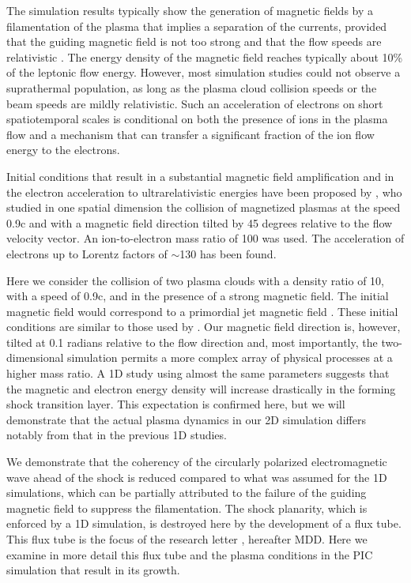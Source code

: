\documentclass[structabstract]{aa}
\begin{document}
The simulation results typically show the generation of magnetic fields by a 
filamentation of the plasma that implies a separation of the currents, provided 
that the guiding magnetic field is not too strong and that the flow speeds are 
relativistic \citep{Cary:1981sf}. The energy density of the magnetic field reaches 
typically about 10\% of the leptonic flow energy. However, most simulation studies 
could not observe a suprathermal population, as long as the plasma cloud collision 
speeds or the beam speeds are mildly relativistic. Such an acceleration of electrons 
on short spatiotemporal scales is conditional on both the presence of ions in the 
plasma flow and a mechanism that can transfer a significant fraction of the ion flow 
energy to the electrons. 

Initial conditions that result in a substantial magnetic field amplification 
and in the electron acceleration to ultrarelativistic energies have been 
proposed by \citet{Bessho:1999sf}, who studied in one spatial dimension the 
collision of magnetized plasmas at the speed 0.9c and with a magnetic field 
direction tilted by 45 degrees relative to the flow velocity vector. An
ion-to-electron mass ratio of 100 was used. The acceleration of electrons up 
to Lorentz factors of $\sim$130 has been found. 

Here we consider the collision of two plasma clouds with a density ratio of 10,
with a speed of 0.9c, and in the presence of a strong magnetic field. The
initial magnetic field would correspond to a primordial jet magnetic field
\citep{Lyutikov:2003vy,Granot:2003mw}. These initial conditions are similar 
to those used by \citet{Bessho:1999sf}. Our magnetic field direction is, 
however, tilted at 0.1 radians relative to the flow direction and, most 
importantly, the two-dimensional simulation permits a more complex array of 
physical processes at a higher mass ratio. A 1D study using almost the same 
parameters \citep{Dieckmann:2008dp} suggests that the magnetic and electron 
energy density will increase drastically in the forming shock transition 
layer. This expectation is confirmed here, but we will demonstrate that the 
actual plasma dynamics in our 2D simulation differs notably from that in the 
previous 1D studies.

{ We demonstrate that the coherency of the circularly polarized electromagnetic 
wave ahead of the shock is reduced compared to what was assumed for the 1D 
simulations, which can be partially attributed to the failure of the guiding 
magnetic field to suppress the filamentation. The shock planarity, which is 
enforced by a 1D simulation, is destroyed here by the development of a flux 
tube. This flux tube is the focus of the research letter \citet{Murphy:2010lr}, hereafter MDD. Here 
we examine in more detail this flux tube and the plasma conditions in the PIC 
simulation that result in its growth.}
\end{document}
